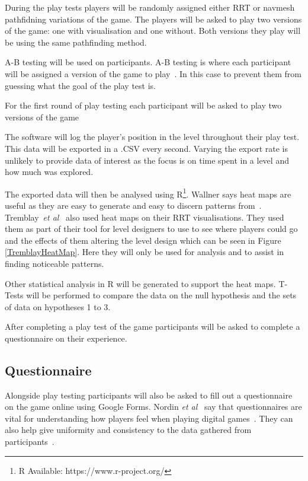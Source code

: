 \documentclass[journal]{IEEEtran}
\begin{document}
During the play tests players will be randomly assigned either RRT or navmesh pathfidning variations of the game. The players will be asked to play two versions of the game: one with visualisation and one without. Both versions they play will be using the same pathfinding method.

A-B testing will be used on participants. A-B testing is where each participant will be assigned a version of the game to play~\cite{Hynninen2014}. In this case to prevent them from guessing what the goal of the play test is. 

For the first round of play testing each participant will be asked to play two versions of the game 

The software will log the player's position in the level throughout their play test. This data will be exported in a .CSV every second. Varying the export rate is unlikely to provide data of interest as the focus is on time spent in a level and how much was explored. 

The exported data will then be analysed using R\footnote[2]{R Available: https://www.r-project.org/}. Wallner says heat maps are useful as they are easy to generate and easy to discern patterns from~\cite{Wallner2015}.  Tremblay~\textit{et al}~\cite{Tremblay2014} also used heat maps on their RRT visualisations. They used them as part of their tool for level designers to use to see where players could go and the effects of them altering the level design which can be seen in Figure \ref{TremblayHeatMap}. Here they will only be used for analysis and to assist in finding noticeable patterns.

Other statistical analysis in R will be generated to support the heat maps. T-Tests will be performed to compare the data on the null hypothesis and the sets of data on hypotheses 1 to 3.
 
After completing a play test of the game participants will be asked to complete a questionnaire on their experience.

\subsection{Questionnaire} \label{Questionnaire}

Alongside play testing participants will also be asked to fill out a questionnaire on the game online using Google Forms. Nordin \textit{et al}~\cite{nordin2014} say that questionnaires are vital for understanding how players feel when playing digital games~\cite{nordin2014,Denisova2016}. They can also help give uniformity and consistency to the data gathered from participants~\cite{Denisova2016}.
\end{document}
